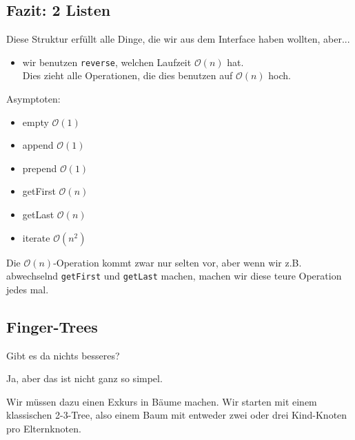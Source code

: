 \documentclass{beamer}
\begin{document}
\subsection{Fazit: 2 Listen}


\begin{frame}
Diese Struktur erfüllt alle Dinge, die wir aus dem Interface haben wollten, aber...
\pause
\begin{itemize}
 \item wir benutzen \texttt{reverse}, welchen Laufzeit $\mathcal{O}(n)$ hat.\\
 \pause
       Dies zieht alle Operationen, die dies benutzen auf $\mathcal{O}(n)$ hoch.\\
\end{itemize}
\pause\bigskip

Asymptoten:
\begin{multicols}{2}
\begin{itemize}
 \item empty $\mathcal{O}(1)$
 \item append $\mathcal{O}(1)$
 \item prepend $\mathcal{O}(1)$
\end{itemize}
\columnbreak
\begin{itemize}
 \item getFirst $\mathcal{O}(n)$
 \item getLast $\mathcal{O}(n)$
 \item iterate $\mathcal{O}(n^2)$
\end{itemize}
\end{multicols}

\pause
Die $\mathcal{O}(n)$-Operation kommt zwar nur selten vor, aber wenn wir z.B. abwechselnd \texttt{getFirst} und \texttt{getLast} machen, machen wir diese teure Operation jedes mal.
\end{frame}

\subsection{Finger-Trees}

\begin{frame}
Gibt es da nichts besseres?\pause\smallskip

Ja, aber das ist nicht ganz so simpel.\pause\bigskip

Wir müssen dazu einen Exkurs in Bäume machen. Wir starten mit einem klassischen 2-3-Tree, also einem Baum mit entweder zwei oder drei Kind-Knoten pro Elternknoten.
\end{frame}
\end{document}
